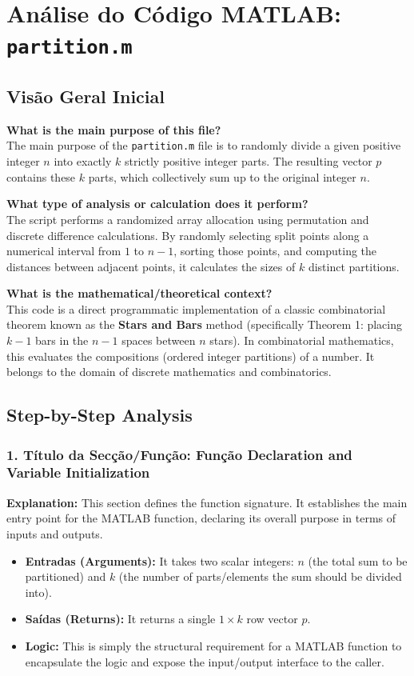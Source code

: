
\chapter{Análise do Código MATLAB: \texttt{partition.m}}
\section{Visão Geral Inicial}

\textbf{What is the main purpose of this file?}\\
The main purpose of the \texttt{partition.m} file is to randomly divide a given positive integer $n$ into exactly $k$ strictly positive integer parts. The resulting vector $p$ contains these $k$ parts, which collectively sum up to the original integer $n$.

\textbf{What type of analysis or calculation does it perform?}\\
The script performs a randomized array allocation using permutation and discrete difference calculations. By randomly selecting split points along a numerical interval from $1$ to $n-1$, sorting those points, and computing the distances between adjacent points, it calculates the sizes of $k$ distinct partitions.

\textbf{What is the mathematical/theoretical context?}\\
This code is a direct programmatic implementation of a classic combinatorial theorem known as the \textbf{Stars and Bars} method (specifically Theorem 1: placing $k-1$ bars in the $n-1$ spaces between $n$ stars). In combinatorial mathematics, this evaluates the compositions (ordered integer partitions) of a number. It belongs to the domain of discrete mathematics and combinatorics.

\section{Step-by-Step Analysis}

\subsection{1. Título da Secção/Função: Função Declaration and Variable Initialization}
\textbf{Explanation:} 
This section defines the function signature. It establishes the main entry point for the MATLAB function, declaring its overall purpose in terms of inputs and outputs. 
\begin{itemize}
    \item \textbf{Entradas (Arguments):} It takes two scalar integers: $n$ (the total sum to be partitioned) and $k$ (the number of parts/elements the sum should be divided into).
    \item \textbf{Saídas (Returns):} It returns a single $1 \times k$ row vector $p$.
    \item \textbf{Logic:} This is simply the structural requirement for a MATLAB function to encapsulate the logic and expose the input/output interface to the caller.
\end{itemize}

